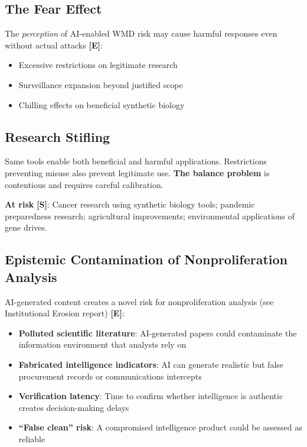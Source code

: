 \documentclass[11pt,letterpaper]{article}
\begin{document}
\subsection{The Fear Effect}

The \textit{perception} of AI-enabled WMD risk may cause harmful responses even without actual attacks \textbf{[E]}:
\begin{itemize}
  \item Excessive restrictions on legitimate research
  \item Surveillance expansion beyond justified scope
  \item Chilling effects on beneficial synthetic biology
\end{itemize}

\subsection{Research Stifling}

Same tools enable both beneficial and harmful applications. Restrictions preventing misuse also prevent legitimate use. \textbf{The balance problem} is contentious and requires careful calibration.

\textbf{At risk} \textbf{[S]}: Cancer research using synthetic biology tools; pandemic preparedness research; agricultural improvements; environmental applications of gene drives.

\subsection{Epistemic Contamination of Nonproliferation Analysis}

AI-generated content creates a novel risk for nonproliferation analysis (see Institutional Erosion report) \textbf{[E]}:
\begin{itemize}[nosep]
  \item \textbf{Polluted scientific literature}: AI-generated papers could contaminate the information environment that analysts rely on
  \item \textbf{Fabricated intelligence indicators}: AI can generate realistic but false procurement records or communications intercepts
  \item \textbf{Verification latency}: Time to confirm whether intelligence is authentic creates decision-making delays
  \item \textbf{``False clean'' risk}: A compromised intelligence product could be assessed as reliable
\end{itemize}
\end{document}
